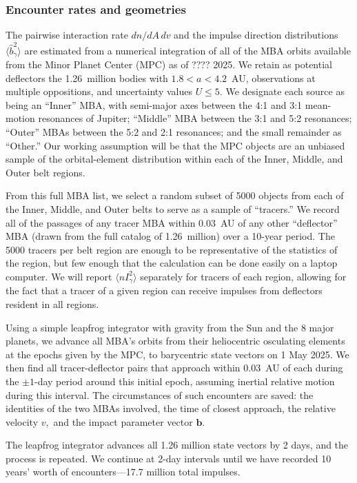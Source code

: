 \documentclass[linenumbers, onecolumn]{aastex631}
\newcommand{\vecb}{\mathbf{b}}
\begin{document}
\subsubsection{Encounter rates and geometries}
The pairwise interaction rate $dn/dA\,dv$ and the impulse direction
distributions $\langle \hat b^2_\gamma \rangle$ are estimated from a
numerical integration of all of the MBA orbits available
from the Minor Planet Center (MPC) as of ???? 2025.   We retain as
potential deflectors the 1.26~million bodies with $1.8<a<4.2$~AU,
observations at multiple oppositions, and uncertainty values $U\le5.$
We designate each source as being an ``Inner'' MBA, with semi-major axes between the 4:1 and 3:1
mean-motion resonances of Jupiter; ``Middle'' MBA between the 3:1 and
5:2 resonances; ``Outer'' MBAs between the 5:2 and 2:1
resonances; and the small remainder as ``Other.''  Our working
assumption will be that the MPC objects are an unbiased sample of the
orbital-element distribution within each of the Inner, Middle, and
Outer belt regions.

From this full MBA list, we select a random subset of 5000 objects
from each of the Inner, Middle, and Outer belts to serve as a sample
of ``tracers.''  We record all of the passages of any tracer MBA
within 0.03~AU of any other ``deflector'' MBA (drawn from the full
catalog of 1.26~million) over a 10-year period.  The 5000 tracers per
belt region are enough to be representative of the statistics of
the region, but few enough that the calculation can be done easily
on a laptop computer.
We will report $\langle nI_\gamma^2\rangle$
separately for tracers of each region, allowing for the fact that a
tracer of a given region can receive impulses from deflectors resident
in all regions.

Using a simple leapfrog integrator with gravity from the Sun and the 8
major planets, we advance all MBA's orbits from their heliocentric
osculating elements at the epochs given by the MPC, to barycentric
state vectors on 1 May 2025.  We then find all tracer-deflector pairs
that approach within 0.03~AU of each during the $\pm1$-day period
around this initial epoch, assuming inertial relative motion during
this interval.  The circumstances of such encounters are saved: the
identities of the two MBAs involved, the time of closest approach, the
relative velocity $v,$ and the impact parameter vector $\vecb.$

The leapfrog integrator advances all 1.26 million state vectors by 2
days, and the process is repeated.  We continue at 2-day intervals
until we have recorded 10 years' worth of encounters---17.7 million
total impulses.
\end{document}
